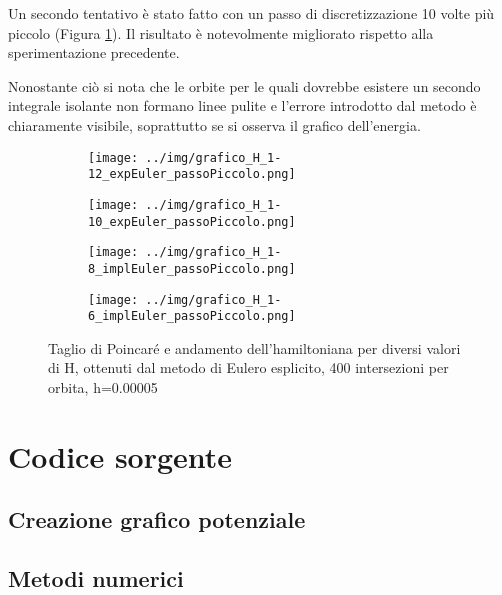 \documentclass[a4paper, 12pt]{article}
\numberwithin{equation}{section}
\numberwithin{figure}{section}
\begin{document}
Un secondo tentativo è stato fatto con un passo di discretizzazione 10 volte più piccolo
(Figura \ref{img:euleroesplicitopiccolo}). Il risultato è notevolmente migliorato rispetto
alla sperimentazione precedente.

Nonostante ciò si nota che le orbite per le quali dovrebbe esistere un secondo integrale
isolante non formano linee pulite e l'errore introdotto dal metodo è chiaramente visibile,
soprattutto se si osserva il grafico dell'energia.

\begin{figure}[h!]
	\centering
	\begin{subfigure}[t]{.49\textwidth}
		\centering
		\texttt{[image: ../img/grafico\_H\_1-12\_expEuler\_passoPiccolo.png]}
	\end{subfigure}
	\begin{subfigure}[t]{.49\textwidth}
		\centering
		\texttt{[image: ../img/grafico\_H\_1-10\_expEuler\_passoPiccolo.png]}
	\end{subfigure}
	\begin{subfigure}[t]{.49\textwidth}
		\centering
		\texttt{[image: ../img/grafico\_H\_1-8\_implEuler\_passoPiccolo.png]}
	\end{subfigure}
	\begin{subfigure}[t]{.49\textwidth}
		\centering
		\texttt{[image: ../img/grafico\_H\_1-6\_implEuler\_passoPiccolo.png]}
	\end{subfigure}

	\caption{Taglio di Poincaré e andamento dell'hamiltoniana per diversi valori di H,
	ottenuti dal metodo di Eulero esplicito, 400 intersezioni per orbita, h=0.00005}
	\label{img:euleroesplicitopiccolo}
\end{figure}

\clearpage
\section{Codice sorgente}
\subsection{Creazione grafico potenziale}

\clearpage
\subsection{Metodi numerici}


\clearpage
\printbibliography
\end{document}
